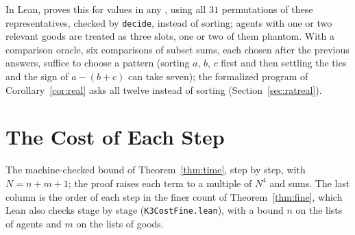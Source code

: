 \documentclass[runningheads,11pt]{llncs}
\begin{document}
\noindent In Lean,  proves this for values in any , using all $31$ permutations of these representatives, checked by \texttt{decide}, instead of sorting; agents with one or two relevant goods are treated as three slots, one or two of them phantom. With a comparison oracle, six comparisons of subset sums, each chosen after the previous answers, suffice to choose a pattern (sorting $a$, $b$, $c$ first and then settling the ties and the sign of $a-(b+c)$ can take seven); the formalized program of Corollary~\ref{cor:real} asks all twelve instead of sorting (Section~\ref{sec:ratreal}).

\section{The Cost of Each Step}\label{app:cost}

The machine-checked bound of Theorem~\ref{thm:time}, step by step, with $N=n+m+1$; the proof raises each term to a multiple of $N^4$ and sums. The last column is the order of each step in the finer count of Theorem~\ref{thm:fine}, which Lean also checks stage by stage (\texttt{K3CostFine.lean}), with a bound $n$ on the lists of agents and $m$ on the lists of goods.
\end{document}
